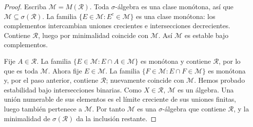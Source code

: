 \begin{proof}
Escriba $\mathcal M=M(\mathcal R)$. Toda $\sigma$-álgebra es una clase monótona, así que $\mathcal M\subseteq\sigma(\mathcal R)$. La familia $\{E\in\mathcal M:E^c\in\mathcal M\}$ es una clase monótona: los complementos intercambian uniones crecientes e intersecciones decrecientes. Contiene $\mathcal R$, luego por minimalidad coincide con $\mathcal M$. Así $\mathcal M$ es estable bajo complementos.

Fije $A\in\mathcal R$. La familia $\{E\in\mathcal M:E\cap A\in\mathcal M\}$ es monótona y contiene $\mathcal R$, por lo que es toda $\mathcal M$. Ahora fije $E\in\mathcal M$. La familia $\{F\in\mathcal M:E\cap F\in\mathcal M\}$ es monótona y, por el paso anterior, contiene $\mathcal R$; nuevamente coincide con $\mathcal M$. Hemos probado estabilidad bajo intersecciones binarias. Como $X\in\mathcal R$, $\mathcal M$ es un álgebra. Una unión numerable de sus elementos es el límite creciente de sus uniones finitas, luego también pertenece a $\mathcal M$. Por tanto $\mathcal M$ es una $\sigma$-álgebra que contiene $\mathcal R$, y la minimalidad de $\sigma(\mathcal R)$ da la inclusión restante.
\end{proof}

